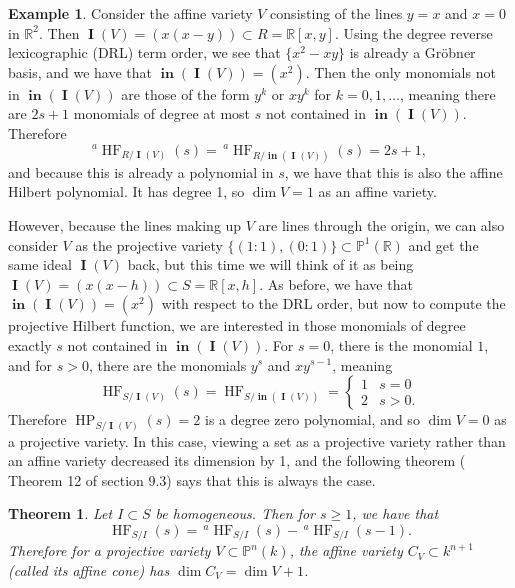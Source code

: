 \documentclass[11pt]{article}
\newcommand{\R}{\mathbb{R}}
\newcommand{\Proj}{\mathbb{P}}
\DeclareMathOperator{\Init}{\mathbf{in}}
\DeclareMathOperator{\HF}{HF}
\DeclareMathOperator{\HP}{HP}
\DeclareMathOperator{\I}{\mathbf{I}}
\newtheorem{theorem}{Theorem}
\theoremstyle{definition}
\newtheorem{example}{Example}
\begin{document}
\begin{example}
	Consider the affine variety $V$ consisting of the lines $y = x$ and $x = 0$ in $\R^2$. Then $\I(V) = (x(x - y)) \subset R = \R[x,y]$. Using the degree reverse lexicographic (DRL) term order, we see that $\{x^2 - xy\}$ is already a Gröbner basis, and we have that $\Init(\I(V)) = (x^2)$. Then the only monomials not in $\Init(\I(V))$ are those of the form $y^k$ or $xy^k$ for $k = 0, 1, \dots$, meaning there are $2s + 1$ monomials of degree at most $s$ not contained in $\Init(\I(V))$. Therefore \[ ^a\HF_{R/\I(V)}(s) = \,^a\HF_{R/\Init(\I(V))}(s) = 2s + 1, \] and because this is already a polynomial in $s$, we have that this is also the affine Hilbert polynomial. It has degree 1, so $\dim V = 1$ as an affine variety. 

	However, because the lines making up $V$ are lines through the origin, we can also consider $V$ as the projective variety $\{(1:1), (0:1)\} \subset \Proj^1(\R)$ and get the same ideal $\I(V)$ back, but this time we will think of it as being $\I(V) = (x(x - h)) \subset S = \R[x,h]$. As before, we have that $\Init(\I(V)) = (x^2)$ with respect to the DRL order, but now to compute the projective Hilbert function, we are interested in those monomials of degree exactly $s$ not contained in $\Init(\I(V))$. For $s = 0$, there is the monomial $1$, and for $s > 0$, there are the monomials $y^s$ and $xy^{s - 1}$, meaning \[ \HF_{S/\I(V)}(s) = \HF_{S/\Init(\I(V))} = \begin{cases}
		1 & s = 0 \\
		2 & s > 0.
	\end{cases} \] Therefore $\HP_{S/\I(V)}(s) = 2$ is a degree zero polynomial, and so $\dim V = 0$ as a projective variety. In this case, viewing a set as a projective variety rather than an affine variety decreased its dimension by 1, and the following theorem (\cite{cox2013ideals} Theorem 12 of section 9.3) says that this is always the case. 
\end{example}


\begin{theorem}
	Let $I \subset S$ be homogeneous. Then for $s \geq 1$, we have that \[ \HF_{S/I}(s) = \,^a\HF_{S/I}(s) - \, ^a\HF_{S/I}(s - 1). \] Therefore for a projective variety $V \subset \Proj^n(k)$, the affine variety $C_V \subset k^{n+1}$ (called its affine cone) has $\dim C_V = \dim V + 1$. 
\end{theorem}
\end{document}
